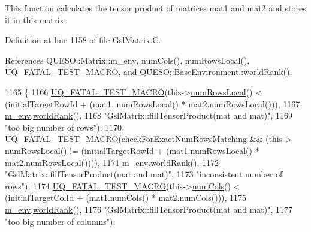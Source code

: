This function calculates the tensor product of matrices {\ttfamily mat1} and {\ttfamily mat2} and stores it in {\ttfamily this} matrix. 



Definition at line 1158 of file Gsl\-Matrix.\-C.



References Q\-U\-E\-S\-O\-::\-Matrix\-::m\-\_\-env, num\-Cols(), num\-Rows\-Local(), U\-Q\-\_\-\-F\-A\-T\-A\-L\-\_\-\-T\-E\-S\-T\-\_\-\-M\-A\-C\-R\-O, and Q\-U\-E\-S\-O\-::\-Base\-Environment\-::world\-Rank().


\begin{DoxyCode}
1165 \{
1166   \hyperlink{_defines_8h_a56d63d18d0a6d45757de47fcc06f574d}{UQ\_FATAL\_TEST\_MACRO}(this->\hyperlink{class_q_u_e_s_o_1_1_gsl_matrix_ab5ec937a9fd439eef1a87e12c0dbccb4}{numRowsLocal}() < (initialTargetRowId + (mat1.
      numRowsLocal() * mat2.numRowsLocal())),
1167                       \hyperlink{class_q_u_e_s_o_1_1_matrix_a247fb0fc0b87fecdee054bb4660b68e8}{m\_env}.\hyperlink{class_q_u_e_s_o_1_1_base_environment_a78b57112bbd0e6dd0e8afec00b40ffa7}{worldRank}(),
1168                       \textcolor{stringliteral}{"GslMatrix::fillTensorProduct(mat and mat)"},
1169                       \textcolor{stringliteral}{"too big number of rows"});
1170   \hyperlink{_defines_8h_a56d63d18d0a6d45757de47fcc06f574d}{UQ\_FATAL\_TEST\_MACRO}(checkForExactNumRowsMatching && (this->
      \hyperlink{class_q_u_e_s_o_1_1_gsl_matrix_ab5ec937a9fd439eef1a87e12c0dbccb4}{numRowsLocal}() != (initialTargetRowId + (mat1.numRowsLocal() * mat2.numRowsLocal()))),
1171                       \hyperlink{class_q_u_e_s_o_1_1_matrix_a247fb0fc0b87fecdee054bb4660b68e8}{m\_env}.\hyperlink{class_q_u_e_s_o_1_1_base_environment_a78b57112bbd0e6dd0e8afec00b40ffa7}{worldRank}(),
1172                       \textcolor{stringliteral}{"GslMatrix::fillTensorProduct(mat and mat)"},
1173                       \textcolor{stringliteral}{"inconsistent number of rows"});
1174   \hyperlink{_defines_8h_a56d63d18d0a6d45757de47fcc06f574d}{UQ\_FATAL\_TEST\_MACRO}(this->\hyperlink{class_q_u_e_s_o_1_1_gsl_matrix_ad5005f168fe030468e834776afb1859b}{numCols}() < (initialTargetColId + (mat1.numCols() * 
      mat2.numCols())),
1175                       \hyperlink{class_q_u_e_s_o_1_1_matrix_a247fb0fc0b87fecdee054bb4660b68e8}{m\_env}.\hyperlink{class_q_u_e_s_o_1_1_base_environment_a78b57112bbd0e6dd0e8afec00b40ffa7}{worldRank}(),
1176                       \textcolor{stringliteral}{"GslMatrix::fillTensorProduct(mat and mat)"},
1177                       \textcolor{stringliteral}{"too big number of columns"});

\end{DoxyCode}

